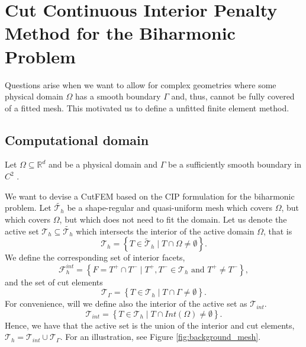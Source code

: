 \newpage
\section{Cut Continuous Interior Penalty Method for the Biharmonic Problem}%
\label{sec:cutcip_biharmonic_problem}


Questions arise when we want to allow for complex geometries where some physical domain $\Omega $ has a smooth boundary $\Gamma $ and, thus, cannot be fully covered of a fitted mesh. This motivated us to define a unfitted finite element method.


\subsection{Computational domain}%
\label{sub:unfitted_mesh}

Let $\Omega \subseteq    \mathbb{R} ^d$ and be a physical domain and $\Gamma  $ be a sufficiently smooth boundary in $C^2$ .

We want to devise a CutFEM based on the CIP formulation for the biharmonic problem. Let $\widetilde{\mathcal{T}_{h} } $ be a shape-regular and quasi-uniform mesh which covers $\Omega $, but which covers $\Omega $, but which does not need to fit the
domain. Let us denote the active set $\mathcal{T} _{h} \subseteq \widetilde{\mathcal{T}_{h}}$ which intersects the interior of the active domain $\Omega $, that is  \[
\mathcal{T} _{h} = \left\{ T \in \widetilde{\mathcal{T} }_{h}  \mid  T \cap \Omega   \neq \emptyset    \right\} .
\]
We define the corresponding set of interior facets, \[
    \mathcal{F} _{h}^{int} = \left\{ F = T^{+} \cap T^{-}  \mid  T^{+}, T^{-} \in \mathcal{T} _{h} \text{ and } T^{+} \neq T^{-} \right\},
\]
and the set of cut elements \[
\mathcal{T} _{\Gamma } = \left\{ T \in \mathcal{T} _{h}   \mid  T \cap \Gamma \neq \emptyset  \right\}.
\]
For convenience, will we define also the interior of the active set as $\mathcal{T} _{int}$.
\[
\mathcal{T} _{int} = \left\{ T \in \mathcal{T} _{h}   \mid  T \cap  Int(\Omega ) \neq \emptyset  \right\}.
\]
Hence, we have that the active set is the union of the interior and cut elements, $\mathcal{T} _{h} = \mathcal{T} _{int} \cup  \mathcal{T} _{\Gamma }$. For an illustration, see Figure \ref{fig:background_mesh}.


